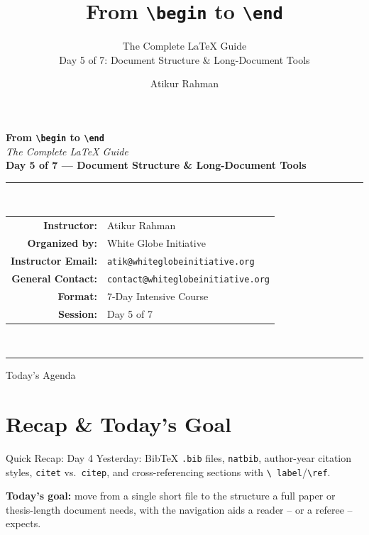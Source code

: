 \documentclass[11pt,aspectratio=169]{beamer}
\title[\texttt{\textbackslash begin} to \texttt{\textbackslash end}]{From \texttt{\textbackslash begin} to \texttt{\textbackslash end}}
\subtitle{The Complete LaTeX Guide \\[2pt] \normalsize Day 5 of 7: Document Structure \& Long-Document Tools}
\author[A.\ Rahman]{Atikur Rahman}
\institute[White Globe Initiative]{White Globe Initiative}
\begin{document}
\begin{frame}[plain]
  \begin{center}
    \vspace{4pt}
    {\Huge\bfseries{}From \texttt{\textbackslash begin} to \texttt{\textbackslash end}}\\[6pt]
    {\Large\itshape The Complete LaTeX Guide}\\[18pt]
    {\large\bfseries Day 5 of 7 --- Document Structure \& Long-Document Tools}\\[22pt]
    \rule{0.7\textwidth}{0.4pt}\\[14pt]
    \begin{tabular}{rl}
      \textbf{Instructor:}       & Atikur Rahman \\[3pt]
      \textbf{Organized by:}     & White Globe Initiative \\[3pt]
      \textbf{Instructor Email:} & \texttt{atik@whiteglobeinitiative.org} \\[3pt]
      \textbf{General Contact:}  & \texttt{contact@whiteglobeinitiative.org} \\[3pt]
      \textbf{Format:}           & 7-Day Intensive Course \\[3pt]
      \textbf{Session:}          & Day 5 of 7 \\
    \end{tabular}\\[18pt]
    \rule{0.7\textwidth}{0.4pt}
  \end{center}
\end{frame}

\begin{frame}{Today's Agenda}
  \tableofcontents
\end{frame}

\section{Recap \& Today's Goal}

\begin{frame}{Quick Recap: Day 4}
  \small
  Yesterday: BibTeX \texttt{.bib} files, \texttt{natbib}, author-year
  citation styles, \texttt{citet} vs.\ \texttt{citep}, and
  cross-referencing sections with \texttt{\textbackslash
  label}/\texttt{\textbackslash ref}.
  \vspace{6pt}

  \textbf{Today's goal:} move from a single short file to the
  structure a full paper or thesis-length document needs, with the
  navigation aids a reader -- or a referee -- expects.
\end{frame}
\end{document}
